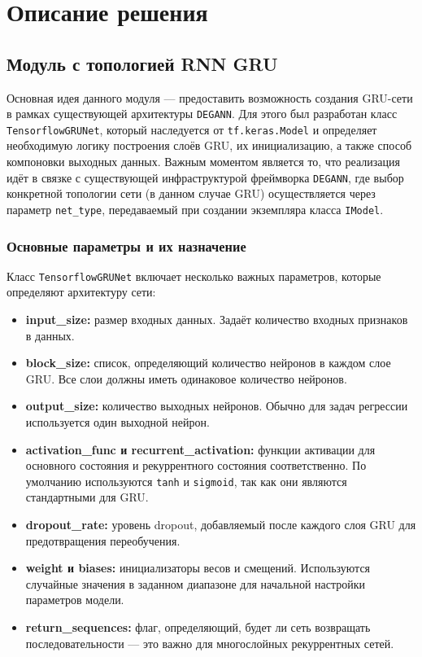 
\section{Описание решения}


\subsection{Модуль с топологией RNN GRU}
\label{subsec:task1}


Основная идея данного модуля — предоставить возможность создания GRU-сети в рамках существующей архитектуры \texttt{DEGANN}. Для этого был разработан класс \texttt{TensorflowGRUNet}, который наследуется от \texttt{tf.keras.Model} и определяет необходимую логику построения слоёв GRU, их инициализацию, а также способ компоновки выходных данных. Важным моментом является то, что реализация идёт в связке с существующей инфраструктурой фреймворка \texttt{DEGANN}, где выбор конкретной топологии сети (в данном случае GRU) осуществляется через параметр \texttt{net\_type}, передаваемый при создании экземпляра класса \texttt{IModel}.

\subsubsection{Основные параметры и их назначение}
Класс \texttt{TensorflowGRUNet} включает несколько важных параметров, которые определяют архитектуру сети:
\begin{itemize}
    \item \textbf{input\_size:} размер входных данных. Задаёт количество входных признаков в данных.
    \item \textbf{block\_size:} список, определяющий количество нейронов в каждом слое GRU. Все слои должны иметь одинаковое количество нейронов.
    \item \textbf{output\_size:} количество выходных нейронов. Обычно для задач регрессии используется один выходной нейрон.
    \item \textbf{activation\_func и recurrent\_activation:} функции активации для основного состояния и рекуррентного состояния соответственно. По умолчанию используются \texttt{tanh} и \texttt{sigmoid}, так как они являются стандартными для GRU.
    \item \textbf{dropout\_rate:} уровень dropout, добавляемый после каждого слоя GRU для предотвращения переобучения.
    \item \textbf{weight и biases:} инициализаторы весов и смещений. Используются случайные значения в заданном диапазоне для начальной настройки параметров модели.
    \item \textbf{return\_sequences:} флаг, определяющий, будет ли сеть возвращать последовательности — это важно для многослойных рекуррентных сетей.
\end{itemize}

